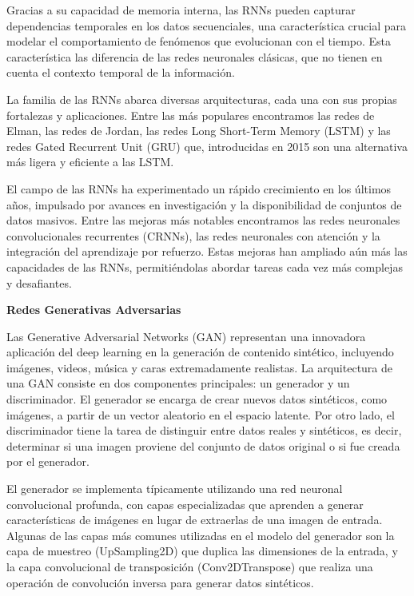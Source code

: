 \documentclass[
  a4paper,
  DIV=11,
  numbers=noendperiod]{scrreprt}
\begin{document}
Gracias a su capacidad de memoria interna, las RNNs pueden capturar
dependencias temporales en los datos secuenciales, una característica
crucial para modelar el comportamiento de fenómenos que evolucionan con
el tiempo. Esta característica las diferencia de las redes neuronales
clásicas, que no tienen en cuenta el contexto temporal de la
información.

La familia de las RNNs abarca diversas arquitecturas, cada una con sus
propias fortalezas y aplicaciones. Entre las más populares encontramos
las redes de Elman, las redes de Jordan, las redes Long Short-Term
Memory (LSTM) y las redes Gated Recurrent Unit (GRU) que, introducidas
en 2015 son una alternativa más ligera y eficiente a las LSTM.

El campo de las RNNs ha experimentado un rápido crecimiento en los
últimos años, impulsado por avances en investigación y la disponibilidad
de conjuntos de datos masivos. Entre las mejoras más notables
encontramos las redes neuronales convolucionales recurrentes (CRNNs),
las redes neuronales con atención y la integración del aprendizaje por
refuerzo. Estas mejoras han ampliado aún más las capacidades de las
RNNs, permitiéndolas abordar tareas cada vez más complejas y
desafiantes.

\textbf{Redes Generativas Adversarias}

Las Generative Adversarial Networks (GAN) representan una innovadora
aplicación del deep learning en la generación de contenido sintético,
incluyendo imágenes, videos, música y caras extremadamente realistas. La
arquitectura de una GAN consiste en dos componentes principales: un
generador y un discriminador. El generador se encarga de crear nuevos
datos sintéticos, como imágenes, a partir de un vector aleatorio en el
espacio latente. Por otro lado, el discriminador tiene la tarea de
distinguir entre datos reales y sintéticos, es decir, determinar si una
imagen proviene del conjunto de datos original o si fue creada por el
generador.

El generador se implementa típicamente utilizando una red neuronal
convolucional profunda, con capas especializadas que aprenden a generar
características de imágenes en lugar de extraerlas de una imagen de
entrada. Algunas de las capas más comunes utilizadas en el modelo del
generador son la capa de muestreo (UpSampling2D) que duplica las
dimensiones de la entrada, y la capa convolucional de transposición
(Conv2DTranspose) que realiza una operación de convolución inversa para
generar datos sintéticos.
\end{document}

